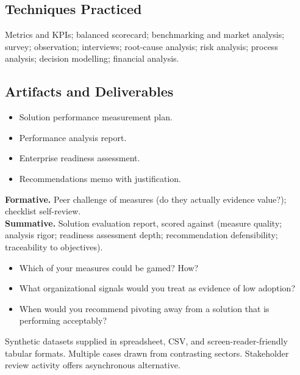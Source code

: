 \documentclass[11pt,letterpaper,oneside]{report}
\begin{document}
\subsection*{Techniques Practiced}
Metrics and KPIs; balanced scorecard; benchmarking and market analysis; survey; observation; interviews; root-cause analysis; risk analysis; process analysis; decision modelling; financial analysis.

\subsection*{Artifacts and Deliverables}
\begin{itemize}
  \item Solution performance measurement plan.
  \item Performance analysis report.
  \item Enterprise readiness assessment.
  \item Recommendations memo with justification.
\end{itemize}

\begin{curriculumassessment}
\textbf{Formative.} Peer challenge of measures (do they actually evidence value?); checklist self-review.\\[3pt]
\textbf{Summative.} Solution evaluation report, scored against  (measure quality; analysis rigor; readiness assessment depth; recommendation defensibility; traceability to objectives).
\end{curriculumassessment}

\begin{curriculumreflection}
\begin{itemize}
  \item Which of your measures could be gamed? How?
  \item What organizational signals would you treat as evidence of low adoption?
  \item When would you recommend pivoting away from a solution that is performing acceptably?
\end{itemize}
\end{curriculumreflection}

\begin{curriculumnote}
Synthetic datasets supplied in spreadsheet, CSV, and screen-reader-friendly tabular formats. Multiple cases drawn from contrasting sectors. Stakeholder review activity offers asynchronous alternative.
\end{curriculumnote}
\end{document}
